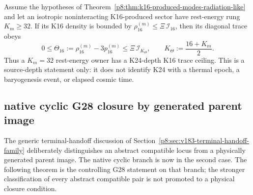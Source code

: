 \documentclass[12pt,a4paper]{article}
\begin{document}
\begin{corollary}
\label{p8:cor:v2185-k16-midpoint-trace-depth}
Assume the hypotheses of Theorem~\ref{p8:thm:k16-produced-modes-radiation-like}
and let an isotropic noninteracting K16-produced sector have rest-energy rung
$K_m\ge32$.  If its K16 density is bounded by
$\rho_{16}^{(m)}\le\Xi\,\mathcal I_{16}$, then its diagonal trace obeys
\[
 \boxed{0\le\Theta_{16}:=\rho_{16}^{(m)}-3p_{16}^{(m)}
 \le\Xi\,\mathcal I_{K_\Theta},\qquad
 K_\Theta:=\frac{16+K_m}{2}.}
\]
Thus a $K_m=32$ rest-energy owner has a K24-depth K16 trace ceiling.  This is
a source-depth statement only: it does not identify K24 with a thermal epoch,
a baryogenesis event, or elapsed cosmic time.
\end{corollary}




\subsection{native cyclic G28 closure by generated parent image}
\label{p8:sec:v2122-g28-native-cyclic-closure}
The generic terminal-handoff discussion of
Section~\ref{p8:sec:v183-terminal-handoff-family} deliberately distinguishes
an abstract compatible locus from a physically generated parent image.  The
native cyclic branch is now in the second case.  The following theorem is the
controlling G28 statement on that branch; the stronger classification of every
abstract compatible pair is not promoted to a physical closure condition.
\end{document}
